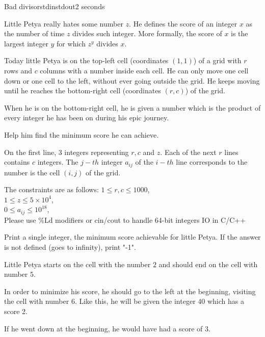 \begin{problem}{Bad divisor}{stdin}{stdout}{2 seconds}


Little Petya really hates some number $z$. He defines the score of an integer $x$ as the number of time $z$ divides such integer.
More formally, the score of $x$ is the largest integer $y$ for which $z^y$ divides $x$.

Today little Petya is on the top-left cell (coordinates $(1,1)$) of a grid with $r$ rows and $c$ columns with a number inside each cell.
He can only move one cell down or one cell to the left, without ever going outside the grid. 
He keeps moving until he reaches the bottom-right cell (coordinates $(r,c)$) of the grid. 
\par When he is on the bottom-right cell, he is given a number which is the product of every integer he has been on during his epic journey. 
\par Help him find the minimum score he can achieve.


\InputFile

On the first line, 3 integers representing $r,c$ and $z$.
Each of the next $r$ lines contains $c$ integers.
The $j-th$ integer $a_{ij}$ of the $i-th$ line corresponds to the number is the cell $(i,j)$ of the grid.


The constraints are as follows:
$1\le r,c \le 1000$,\\ 
$1\le z \le 5\times 10^4$,\\ 
$0\le a_{ij} \le 10^{18}$,\\ 

Please use \%Ld modifiers or cin/cout to handle 64-bit integers IO in C/C++

\OutputFile

Print a single integer, the minimum score achievable for little Petya.
If the answer is not defined (goes to infinity), print "-1".

\Example

\begin{examplewide}
%
\end{examplewide}

Little Petya starts on the cell with the number $2$ and should end on the cell with number $5$.
\par In order to minimize his score, he should go to the left at the beginning, visiting the cell with number $6$. Like this, he will be given the integer $40$ which has a score 2.
\par If he went down at the beginning, he would have had a score of 3.

\end{problem}
